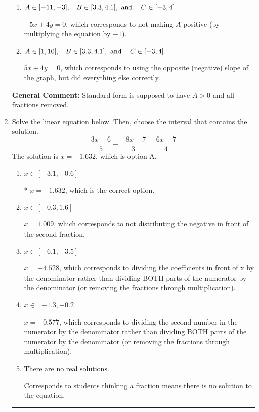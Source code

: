 \documentclass{extbook}[14pt]
\newcommand{\litem}[1]{\item #1

\rule{\textwidth}{0.4pt}}
\begin{document}
\begin{enumerate}
{\begin{enumerate}[label=\Alph*.]
 $-1.25x + 1y = -0.0$, which corresponds to not removing rational values for Standard Form.
\item \( A \in [-11, -3], \hspace{3mm} B \in [3.3, 4.1], \text{ and } \hspace{3mm} C \in [-3, 4] \)

 $-5x + 4y = 0$, which corresponds to not making $A$ positive (by multiplying the equation by $-1$).
\item \( A \in [1, 10], \hspace{3mm} B \in [3.3, 4.1], \text{ and } \hspace{3mm} C \in [-3, 4] \)

 $5x + 4y = 0$, which corresponds to using the opposite (negative) slope of the graph, but did everything else correctly.
\end{enumerate}

\textbf{General Comment:} Standard form is supposed to have $A > 0$ and all fractions removed.
}
\litem{
Solve the linear equation below. Then, choose the interval that contains the solution.
\[ \frac{3x -6}{5} - \frac{-8x -7}{3} = \frac{6x -7}{4} \]The solution is \( x = -1.632 \), which is option A.\begin{enumerate}[label=\Alph*.]
\item \( x \in [-3.1, -0.6] \)

* $x = -1.632$, which is the correct option.
\item \( x \in [-0.3, 1.6] \)

 $x = 1.009$, which corresponds to not distributing the negative in front of the second fraction.
\item \( x \in [-6.1, -3.5] \)

 $x = -4.528$, which corresponds to dividing the coefficients in front of x by the denominator rather than dividing BOTH parts of the numerator by the denominator (or removing the fractions through multiplication).
\item \( x \in [-1.3, -0.2] \)

 $x = -0.577$, which corresponds to dividing the second number in the numerator by the denominator rather than dividing BOTH parts of the numerator by the denominator (or removing the fractions through multiplication).
\item \( \text{There are no real solutions.} \)

Corresponds to students thinking a fraction means there is no solution to the equation.
\end{enumerate}

}
\end{enumerate}
\end{document}
